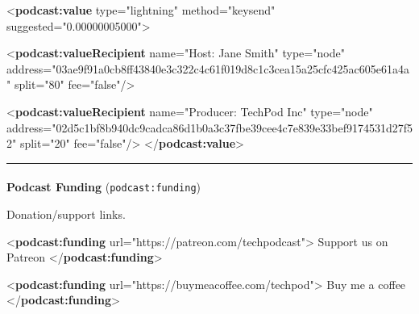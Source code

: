 \documentclass[
  letterpaper,
  DIV=11,
  numbers=noendperiod]{scrartcl}
\makeatletter
\let\oldparagraph\paragraph
\renewcommand{\paragraph}{
    \@ifstar
      \xxxParagraphStar
      \xxxParagraphNoStar
  }
\newcommand{\xxxParagraphStar}[1]{\oldparagraph*{#1}\mbox{}}
\newcommand{\xxxParagraphNoStar}[1]{\oldparagraph{#1}\mbox{}}
\newenvironment{Shaded}{\begin{snugshade}}{\end{snugshade}}
\newcommand{\KeywordTok}[1]{\textcolor[rgb]{0.00,0.23,0.31}{\textbf{#1}}}
\newcommand{\NormalTok}[1]{\textcolor[rgb]{0.00,0.23,0.31}{#1}}
\newcommand{\OtherTok}[1]{\textcolor[rgb]{0.00,0.23,0.31}{#1}}
\newcommand{\StringTok}[1]{\textcolor[rgb]{0.13,0.47,0.30}{#1}}
\makeatother
\begin{document}
\begin{Shaded}
\begin{Highlighting}[]
\NormalTok{\textless{}}\KeywordTok{podcast:value} 
\OtherTok{    type=}\StringTok{"lightning"} 
\OtherTok{    method=}\StringTok{"keysend"} 
\OtherTok{    suggested=}\StringTok{"0.00000005000"}\NormalTok{\textgreater{}}
  
\NormalTok{  \textless{}}\KeywordTok{podcast:valueRecipient} 
\OtherTok{      name=}\StringTok{"Host: Jane Smith"} 
\OtherTok{      type=}\StringTok{"node"} 
\OtherTok{      address=}\StringTok{"03ae9f91a0cb8ff43840e3c322c4c61f019d8c1c3cea15a25cfc425ac605e61a4a"}
\OtherTok{      split=}\StringTok{"80"}
\OtherTok{   fee=}\StringTok{"false"}\NormalTok{/\textgreater{}}
  
\NormalTok{  \textless{}}\KeywordTok{podcast:valueRecipient} 
\OtherTok{      name=}\StringTok{"Producer: TechPod Inc"} 
\OtherTok{      type=}\StringTok{"node"} 
\OtherTok{      address=}\StringTok{"02d5c1bf8b940dc9cadca86d1b0a3c37fbe39cee4c7e839e33bef9174531d27f52"}
\OtherTok{      split=}\StringTok{"20"}
\OtherTok{      fee=}\StringTok{"false"}\NormalTok{/\textgreater{}}
\NormalTok{\textless{}/}\KeywordTok{podcast:value}\NormalTok{\textgreater{}}
\end{Highlighting}
\end{Shaded}

\begin{center}\rule{0.5\linewidth}{0.5pt}\end{center}

\paragraph{\texorpdfstring{\textbf{Podcast Funding}
(\texttt{podcast:funding})}{Podcast Funding (podcast:funding)}}\label{podcast-funding-podcastfunding}

Donation/support links.

\begin{Shaded}
\begin{Highlighting}[]
\NormalTok{\textless{}}\KeywordTok{podcast:funding}\OtherTok{ url=}\StringTok{"https://patreon.com/techpodcast"}\NormalTok{\textgreater{}}
\NormalTok{  Support us on Patreon}
\NormalTok{\textless{}/}\KeywordTok{podcast:funding}\NormalTok{\textgreater{}}

\NormalTok{\textless{}}\KeywordTok{podcast:funding}\OtherTok{ url=}\StringTok{"https://buymeacoffee.com/techpod"}\NormalTok{\textgreater{}}
\NormalTok{  Buy me a coffee}
\NormalTok{\textless{}/}\KeywordTok{podcast:funding}\NormalTok{\textgreater{}}
\end{Highlighting}
\end{Shaded}
\end{document}
